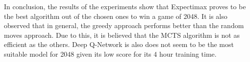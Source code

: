 \documentclass{svproc}
\begin{document}
    In conclusion, the results of the experiments show that Expectimax proves to be the best algorithm out of the chosen ones to win a game of 2048. It is also observed that in general, the greedy approach performs better than the random moves approach. Due to this, it is believed that the MCTS algorithm is not as efficient as the others. Deep Q-Network is also does not seem to be the most suitable model for 2048 given its low score for its 4 hour training time. 

    
    
\end{document}
